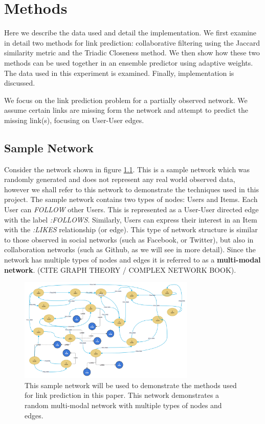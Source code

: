 
\chapter{Methods}
Here we describe the data used and detail the implementation. We first examine in detail two methods for link prediction: collaborative filtering using the Jaccard similarity metric and the Triadic Closeness method. We then show how these two methods can be used together in an ensemble predictor using adaptive weights. The data used in this experiment is examined. Finally, implementation is discussed. 

We focus on the link prediction problem for a partially observed network. We assume certain links are missing form the network and attempt to predict the missing link(s), focusing on User-User edges.

\section{Sample Network}
Consider the network shown in figure \ref{thesis_sample_network}. This is a sample network which was randomly generated and does not represent any real world observed data, however we shall refer to this network to demonstrate the techniques used in this project. The sample network contains two types of nodes: Users and Items. Each User can \textit{FOLLOW} other Users. This is represented as a User-User directed edge with the label \textit{:FOLLOWS}. Similarly, Users can express their interest in an Item with the \textit{:LIKES} relationship (or edge). This type of network structure is similar to those observed in social networks (such as Facebook, or Twitter), but also in collaboration networks (such as Github, as we will see in more detail). Since the network has multiple types of nodes and edges it is referred to as a \textbf{multi-modal network}. (CITE GRAPH THEORY / COMPLEX NETWORK BOOK). 

\begin{figure}[H]
  \centering
  \includegraphics[width=0.75\textwidth]{images/thesis_sample_network_multimodal.png}
  \caption[Sample multi-modal network]{This sample network will be used to demonstrate the methods used for link prediction in this paper. This network demonstrates a random multi-modal network with multiple types of nodes and edges.}
  \label{thesis_sample_network}
\end{figure}

